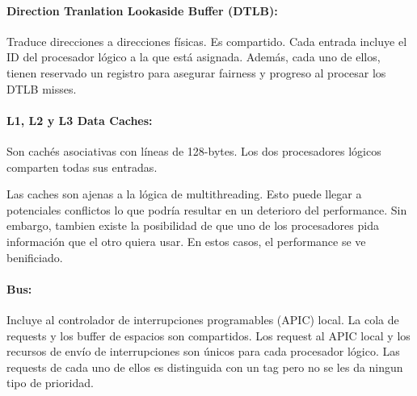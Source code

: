 \paragraph{Direction Tranlation Lookaside Buffer (DTLB):} Traduce direcciones a direcciones físicas. Es compartido. Cada entrada incluye el ID del procesador lógico a la que está asignada. Además, cada uno de ellos, tienen reservado un registro para asegurar fairness y progreso al procesar los DTLB misses.

\paragraph{L1, L2 y L3 Data Caches:}
Son cachés asociativas con líneas de 128-bytes. Los dos procesadores lógicos comparten todas sus entradas.

Las caches son ajenas a la lógica de multithreading. Esto puede llegar a potenciales conflictos lo que podría resultar en un deterioro del performance. Sin embargo, tambien existe la posibilidad de que uno de los procesadores pida información que el otro quiera usar. En estos casos, el performance se ve benificiado.

\paragraph{Bus:} Incluye al controlador de interrupciones programables (APIC) local.
La cola de requests y los buffer de espacios son compartidos. Los request al APIC local y los recursos de envío de interrupciones son únicos para cada procesador lógico. Las requests de cada uno de ellos es distinguida con un tag pero no se les da ningun tipo de prioridad.

